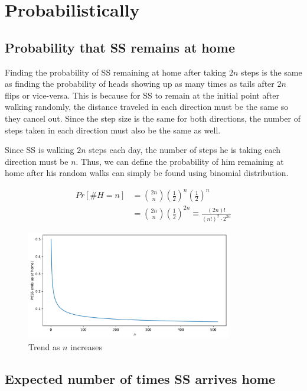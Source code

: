 \chapter{Probabilistically}

\section{Probability that SS remains at home}

Finding the probability of SS remaining at home after taking $2n$ steps is the same as finding the probability of heads showing up as many times as tails after $2n$ flips or vice-versa. This is because for SS to remain at the initial point after walking randomly, the distance traveled in each direction must be the same so they cancel out. Since the step size is the same for both directions, the number of steps taken in each direction must also be the same as well.

Since SS is walking $2n$ steps each day, the number of steps he is taking each direction must be $n$. Thus, we can define the probability of him remaining at home after his random walks can simply be found using binomial distribution.

\begin{equation}
\begin{aligned}
	Pr[\#H = n]
		&=\binom{2n}{n}\left(\frac{1}{2}\right)^n\left(\frac{1}{2}\right)^n \\
		&=\binom{2n}{n}\left(\frac{1}{2}\right)^{2n} \equiv \frac{(2n)!}{(n!)^2 \cdot 2^{2n}}
\end{aligned}
\end{equation}

\begin{figure}[h]
	\centering
	\includegraphics[width=0.8\textwidth]{graphics/02-endsathome.png}
	\caption{Trend as $n$ increases}
\end{figure}

\section{Expected number of times SS arrives home}

